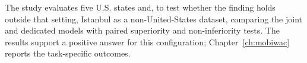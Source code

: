 The study evaluates five
U.S. states and, to test whether the finding holds outside that setting,
Istanbul as a non-United-States dataset, comparing the joint and dedicated models with
paired superiority and non-inferiority tests. The results support a positive answer for
this configuration; Chapter~\ref{ch:mobiwac} reports the task-specific outcomes.

